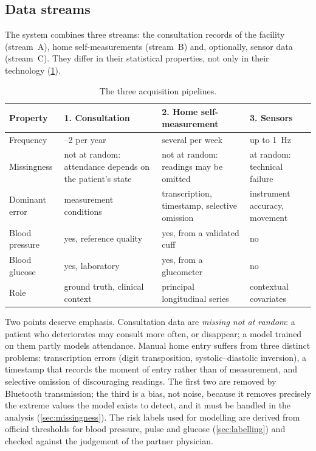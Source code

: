 \subsection{Data streams}\label{sec:pipelines}\label{sec:streams}

The system combines three streams: the consultation records of the facility (stream~A), home self-measurements (stream~B) and, optionally, sensor data (stream~C). They differ in their statistical properties, not only in their technology (\cref{tab:pipelines}).

\begin{table}[htbp]
\centering\footnotesize
\caption{The three acquisition pipelines.}\label{tab:pipelines}
\begin{tabularx}{\textwidth}{@{}>{\raggedright\arraybackslash}p{2.9cm} >{\raggedright\arraybackslash}X >{\raggedright\arraybackslash}X >{\raggedright\arraybackslash}X@{}}
\toprule
\textbf{Property} & \textbf{1. Consultation} & \textbf{2. Home self-measurement} & \textbf{3. Sensors} \\
\midrule
Frequency & 1--2 per year & several per week & up to 1~Hz \\
Missingness & not at random: attendance depends on the patient's state & not at random: readings may be omitted & at random: technical failure \\
Dominant error & measurement conditions & transcription, timestamp, selective omission & instrument accuracy, movement \\
Blood pressure & yes, reference quality & yes, from a validated cuff & no \\
Blood glucose & yes, laboratory & yes, from a glucometer & no \\
Role & ground truth, clinical context & principal longitudinal series & contextual covariates \\
\bottomrule
\end{tabularx}
\end{table}

Two points deserve emphasis. Consultation data are \emph{missing not at random}: a patient who deteriorates may consult more often, or disappear; a model trained on them partly models attendance. Manual home entry suffers from three distinct problems: transcription errors (digit transposition, systolic--diastolic inversion), a timestamp that records the moment of entry rather than of measurement, and selective omission of discouraging readings. The first two are removed by Bluetooth transmission; the third is a bias, not noise, because it removes precisely the extreme values the model exists to detect, and it must be handled in the analysis (\cref{sec:missingness}). The risk labels used for modelling are derived from official thresholds for blood pressure, pulse and glucose (\cref{sec:labelling}) and checked against the judgement of the partner physician.

